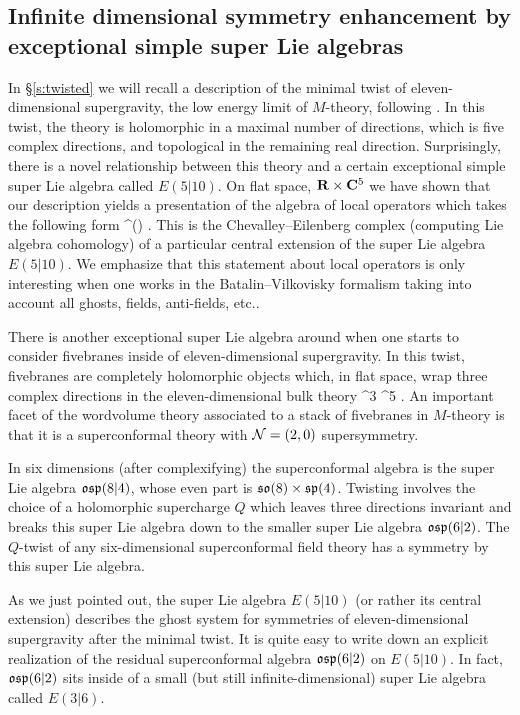 \documentclass[11pt]{amsart}
\begin{document}
\subsection{Infinite dimensional symmetry enhancement by exceptional simple super Lie algebras}

In \S\ref{s:twisted} we will recall a description of the minimal twist of eleven-dimensional supergravity, the low energy limit of $M$-theory, following \cite{RSW}.
In this twist, the theory is holomorphic in a maximal number of directions, which is five complex directions, and topological in the remaining real direction. 
Surprisingly, there is a novel relationship between this theory and a certain exceptional simple super Lie algebra called $E(5|10)$. 
On flat space, $\mathbf{R} \times \mathbf{C}^5$ we have shown that our description yields a presentation of the algebra of local operators which takes the following form 
\beqn
\clie^\bu\left(\right) .
\eeqn
This is the Chevalley--Eilenberg complex (computing Lie algebra cohomology) of a particular central extension of the super Lie algebra $E(5|10)$. 
We emphasize that this statement about local operators is only interesting when one works in the Batalin--Vilkovisky formalism taking into account all ghosts, fields, anti-fields, etc.. 

There is another exceptional super Lie algebra around when one starts to consider fivebranes inside of eleven-dimensional supergravity. 
In this twist, fivebranes are completely holomorphic objects which, in flat space, wrap three complex directions in the eleven-dimensional bulk theory
\beqn
\C^3 \subset \R \times \C^5 .
\eeqn
An important facet of the wordvolume theory associated to a stack of fivebranes in $M$-theory is that it is a superconformal theory with $\mathcal N=(2,0)$ supersymmetry. 

In six dimensions (after complexifying) the superconformal algebra is the super Lie algebra $\mathfrak{osp}(8|4)$, whose even part is $\mathfrak{so}(8) \times \mathfrak{sp}(4)$. 
Twisting involves the choice of a holomorphic supercharge $Q$ which leaves three directions invariant and breaks this super Lie algebra down to the smaller super Lie algebra $\mathfrak{osp}(6|2)$.
The $Q$-twist of any six-dimensional superconformal field theory has a symmetry by this super Lie algebra. 

As we just pointed out, the super Lie algebra $E(5|10)$ (or rather its central extension) describes the ghost system for symmetries of eleven-dimensional supergravity after the minimal twist. 
It is quite easy to write down an explicit realization of the residual superconformal algebra $\mathfrak{osp}(6|2)$ on $E(5|10)$. 
In fact, $\mathfrak{osp}(6|2)$ sits inside of a small (but still infinite-dimensional) super Lie algebra called $E(3|6)$. 
\end{document}
